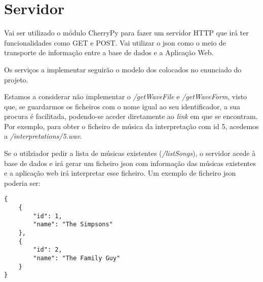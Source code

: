 \chapter{Servidor}
\label{chap.servidor}

Vai ser utilizado o módulo CherryPy \cite{cherry} para fazer um servidor HTTP que irá ter funcionalidades como GET e POST. Vai utilizar o \ac{json} como o meio de transporte de informação entre a base de dados e a Aplicação Web.

Os serviços a implementar seguirão o modelo dos colocados no enunciado do projeto.

Estamos a considerar não implementar o \emph{/getWaveFile} e \emph{/getWaveForm}, visto que, se guardarmos os ficheiros com o nome igual ao seu identificador, a sua procura é facilitada, podendo-se aceder diretamente ao \emph{link} em que se encontram. Por exemplo, para obter o ficheiro de música da interpretação com id 5, acedemos a \emph{/interpretations/5.wav}.

Se o utilziador pedir a lista de músicas existentes (\emph{/listSongs}), o servidor acede à base de dados e irá gerar um ficheiro \ac{json} com informação das músicas existentes e a aplicação web irá interpretar esse ficheiro. Um exemplo de ficheiro \ac{json} poderia ser:

\begin{lstlisting}
{
    {
        "id": 1,
        "name": "The Simpsons"
    },
    {
        "id": 2,
        "name": "The Family Guy"
    }
}
\end{lstlisting}
